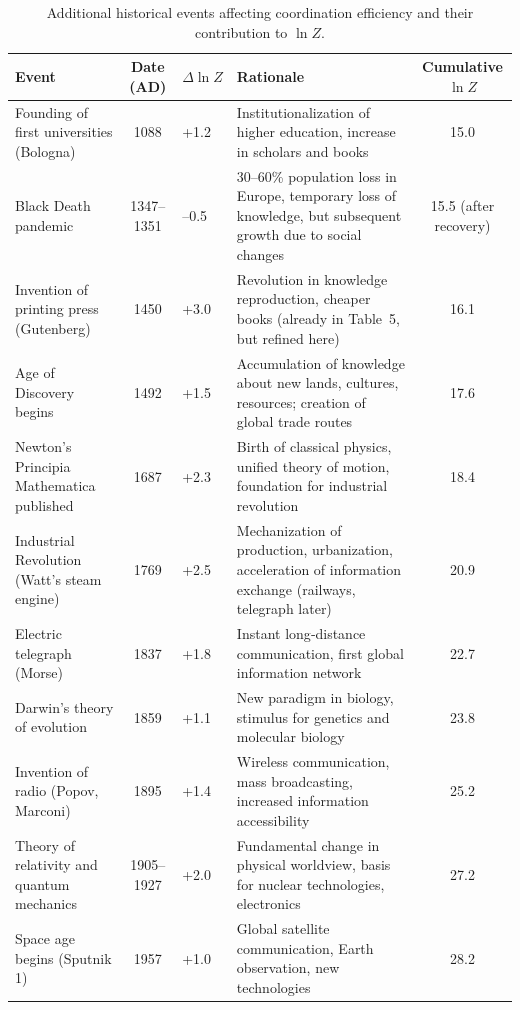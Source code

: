 \documentclass[12pt,a4paper]{article}
\theoremstyle{remark}
\begin{document}
	\begin{table}[htbp]
		\centering
		\caption{Additional historical events affecting coordination efficiency and their contribution to \(\ln Z\).}
		\label{tab:expanded-events}
		\small
		\begin{tabular}{p{3.2cm} c p{2.5cm} p{4.5cm} c}
			\toprule
			\textbf{Event} & \textbf{Date (AD)} & \textbf{\(\Delta \ln Z\)} & \textbf{Rationale} & \textbf{Cumulative \(\ln Z\)} \\
			\midrule
			Founding of first universities (Bologna) & 1088 & +1.2 & Institutionalization of higher education, increase in scholars and books & 15.0 \\
			Black Death pandemic & 1347–1351 & –0.5 & 30–60\% population loss in Europe, temporary loss of knowledge, but subsequent growth due to social changes & 15.5 (after recovery) \\
			Invention of printing press (Gutenberg) & 1450 & +3.0 & Revolution in knowledge reproduction, cheaper books (already in Table~5, but refined here) & 16.1 \\
			Age of Discovery begins & 1492 & +1.5 & Accumulation of knowledge about new lands, cultures, resources; creation of global trade routes & 17.6 \\
			Newton's Principia Mathematica published & 1687 & +2.3 & Birth of classical physics, unified theory of motion, foundation for industrial revolution & 18.4 \\
			Industrial Revolution (Watt's steam engine) & 1769 & +2.5 & Mechanization of production, urbanization, acceleration of information exchange (railways, telegraph later) & 20.9 \\
			Electric telegraph (Morse) & 1837 & +1.8 & Instant long‑distance communication, first global information network & 22.7 \\
			Darwin's theory of evolution & 1859 & +1.1 & New paradigm in biology, stimulus for genetics and molecular biology & 23.8 \\
			Invention of radio (Popov, Marconi) & 1895 & +1.4 & Wireless communication, mass broadcasting, increased information accessibility & 25.2 \\
			Theory of relativity and quantum mechanics & 1905–1927 & +2.0 & Fundamental change in physical worldview, basis for nuclear technologies, electronics & 27.2 \\
			Space age begins (Sputnik 1) & 1957 & +1.0 & Global satellite communication, Earth observation, new technologies & 28.2 \\

\end{tabular}
\end{table}
\end{document}
